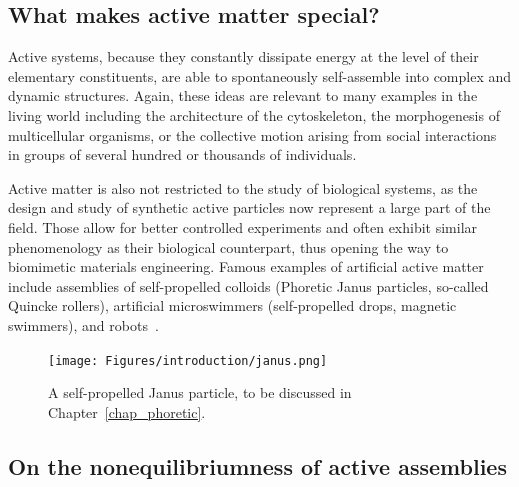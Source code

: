 
\subsection{What makes active matter special?}

Active systems, because they constantly dissipate energy at the level of their elementary constituents, 
are able to spontaneously self-assemble into complex and dynamic structures. 
Again, these ideas are relevant to many examples in the living world including the architecture of the cytoskeleton, the morphogenesis of multicellular organisms, or the collective motion arising from social interactions in groups of several hundred or thousands of individuals. 

Active matter is also not restricted to the study of biological systems, as the design and study of synthetic active particles now represent a large part of the field. Those allow for better controlled experiments and often exhibit similar phenomenology as their biological counterpart, thus opening the way to biomimetic materials engineering. 
Famous examples of artificial active matter include assemblies of self-propelled colloids (Phoretic Janus particles, so-called Quincke rollers), artificial microswimmers (self-propelled drops, magnetic swimmers), and robots~\cite{BechingerRMP2016}.

\begin{figure}[!htb]
    \centering
    \texttt{[image: Figures/introduction/janus.png]}
    \caption{A self-propelled Janus particle, to be discussed in Chapter~\ref{chap_phoretic}.}
    \label{fig: janus}
\end{figure}



\subsection{On the nonequilibriumness of active assemblies}

